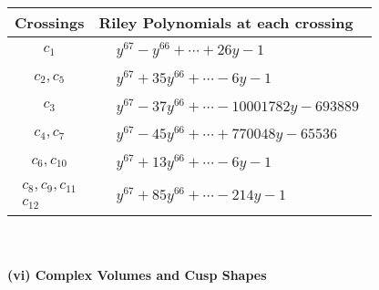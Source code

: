 \documentclass[1p]{elsarticle_modified}
\theoremstyle{definition}
\begin{document}
\begin{tabular}{m{50pt}|m{274pt}}
Crossings & \hspace{64pt}Riley Polynomials at each crossing \\
\hline $$\begin{aligned}c_{1}\end{aligned}$$&$\begin{aligned}
&y^{67}- y^{66}+\cdots+26 y-1
\end{aligned}$\\
\hline $$\begin{aligned}c_{2},c_{5}\end{aligned}$$&$\begin{aligned}
&y^{67}+35 y^{66}+\cdots-6 y-1
\end{aligned}$\\
\hline $$\begin{aligned}c_{3}\end{aligned}$$&$\begin{aligned}
&y^{67}-37 y^{66}+\cdots-10001782 y-693889
\end{aligned}$\\
\hline $$\begin{aligned}c_{4},c_{7}\end{aligned}$$&$\begin{aligned}
&y^{67}-45 y^{66}+\cdots+770048 y-65536
\end{aligned}$\\
\hline $$\begin{aligned}c_{6},c_{10}\end{aligned}$$&$\begin{aligned}
&y^{67}+13 y^{66}+\cdots-6 y-1
\end{aligned}$\\
\hline $$\begin{aligned}c_{8},c_{9},c_{11}\\c_{12}\end{aligned}$$&$\begin{aligned}
&y^{67}+85 y^{66}+\cdots-214 y-1
\end{aligned}$\\
\hline
\end{tabular}\\~\\
\newpage\flushleft \textbf{(vi) Complex Volumes and Cusp Shapes}
\end{document}
